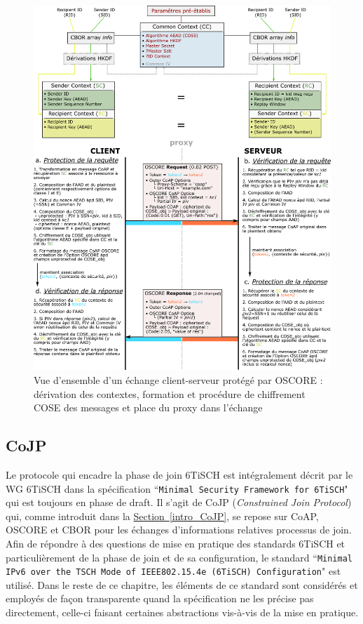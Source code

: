 \documentclass[]{report}
\newcommand{\wordlink}[2]{\hyperref[#2]{#1~\ref{#2}}}
\begin{document}
	\begin{figure}[!hb]
	\centering
	\includegraphics[width=\linewidth]{OSCORE_exchange}
	\caption{Vue d'ensemble d'un échange client-serveur protégé par OSCORE : dérivation des contextes, formation et procédure de chiffrement COSE des messages et place du proxy dans l'échange}
	\label{fig:OSCORE_exchange}
	\end{figure}

\newpage

\subsection{CoJP}
\label{CoJP}

Le protocole qui encadre la phase de join 6TiSCH est intégralement décrit par le WG 6TiSCH dans la spécification ``\texttt{Minimal Security Framework for 6TiSCH}" \cite{ietf-6tisch-minimal-security-15} qui est toujours en phase de draft. Il s'agit de CoJP (\textit{Constrained Join Protocol}) qui, comme introduit dans la \wordlink{Section}{intro_CoJP}, se repose sur CoAP, OSCORE et CBOR pour les échanges d'informations relatives processus de join. Afin de répondre à des questions de mise en pratique des standards 6TiSCH et particulièrement de la phase de join et de sa configuration, le standard ``\texttt{Minimal IPv6 over the TSCH Mode of IEEE802.15.4e (6TiSCH) Configuration}" \cite{rfc8180} est utilisé. Dans le reste de ce chapitre, les éléments de ce standard sont considérés et employés de façon transparente quand la spécification \cite{ietf-6tisch-minimal-security-15} ne les précise pas directement, celle-ci faisant certaines abstractions vis-à-vis de la mise en pratique.\\
\end{document}
